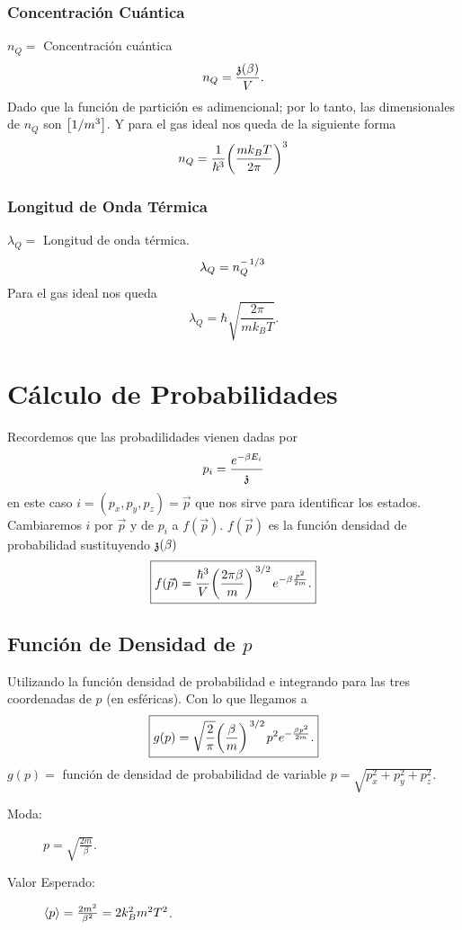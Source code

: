 \subsubsection{Concentración Cuántica}
$n_Q = $ Concentración cuántica
    $$ n_Q = \frac{\mathfrak{z} (\beta)}{V}. $$
Dado que la función de partición es adimencional; por lo tanto, las dimensionales de $n_Q$ son $\qty[1/m^3]$. Y para el gas ideal nos queda de la siguiente forma
    $$ n_Q = \frac{1}{\hbar ^3} \qty(\frac{mk_B T}{2\pi})^3 $$
\subsubsection{Longitud de Onda Térmica}
$\lambda _Q = $ Longitud de onda térmica.
    $$ \lambda _Q = n_Q ^{-\flatfrac{1}{3}} $$
Para el gas ideal nos queda
    $$ \lambda _Q = \hbar \sqrt{\frac{2\pi}{mk_B T}}. $$


\section{Cálculo de Probabilidades}

Recordemos que las probadilidades vienen dadas por
    $$ p_i = \frac{e^{-\beta E_i}}{\mathfrak{z}} $$
en este caso $i = (p_x,p_y,p_z) = \vec{p}$ que nos sirve para identificar los estados. Cambiaremos $i$ por $\vec{p}$ y de $p_i$ a $f(\vec{p})$. $f(\vec{p})$ es la función densidad de probabilidad sustituyendo $\mathfrak{z} (\beta)$
    $$ \boxed{ f(\vec{p}) = \frac{\hbar ^3}{V} \qty(\frac{2\pi \beta}{m})^{\flatfrac{3}{2}} e^{-\beta \frac{p^2}{2m}}. } $$
\subsection{Función de Densidad de $p$}
Utilizando la función densidad de probabilidad e integrando para las tres coordenadas de $p$ (en esféricas). Con lo que llegamos a 
    $$ \boxed{ g(p) = \sqrt{\frac{2}{\pi}} \qty(\frac{\beta}{m})^{\flatfrac{3}{2}} p^2 e^{-\frac{\beta p^2}{2m}}. } $$
$g(p) = $ función de densidad de probabilidad de variable $p = \sqrt{p_x ^2 + p_y ^2 + p_z ^2}.$
\begin{description}
    \item[Moda: ] $p = \sqrt{\frac{2m}{\beta}}$.
    \item[Valor Esperado: ] $\expval{p} = \frac{2m^2}{\beta ^2} = 2k_B ^2 m^2 T^2$.
\end{description}

